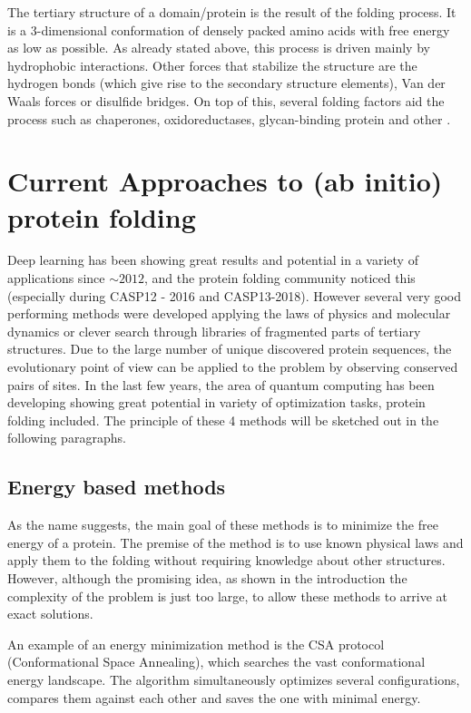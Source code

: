 The tertiary structure of a domain/protein is the result of the folding process. 
It is a 3-dimensional conformation of densely packed amino acids with free energy as low as possible. 
As already stated above, this process is driven mainly by hydrophobic interactions. 
Other forces that stabilize the structure are the hydrogen bonds (which give rise to the secondary structure elements), Van der Waals forces or disulfide bridges. 
On top of this, several folding factors aid the process such as chaperones, oxidoreductases, glycan-binding protein and other \cite{principles_of_pf}.

\section{Current Approaches to (ab initio) protein folding}

Deep learning has been showing great results and potential in a variety of applications since $\sim2012$, and the protein folding community noticed this (especially during CASP12 - 2016 and CASP13-2018). 
However several very good performing methods were developed applying the laws of physics and molecular dynamics or clever search through libraries of fragmented parts of tertiary structures. 
Due to the large number of unique discovered protein sequences, the evolutionary point of view can be applied to the problem by observing conserved pairs of sites. 
In the last few years, the area of quantum computing has been developing showing great potential in variety of optimization tasks, protein folding included.%
The principle of these 4 methods will be sketched out in the following paragraphs.

\subsection{Energy based methods}

As the name suggests, the main goal of these methods is to minimize the free energy of a protein. 
The premise of the method is to use known physical laws and apply them to the folding without requiring knowledge about other structures. 
However, although the promising idea, as shown in the introduction the complexity of the problem is just too large, to allow these methods to arrive at exact solutions.

An example of an energy minimization method is the CSA protocol \cite{csa} (Conformational Space Annealing), which searches the vast conformational energy landscape. 
The algorithm simultaneously optimizes several configurations, compares them against each other and saves the one with minimal energy.

